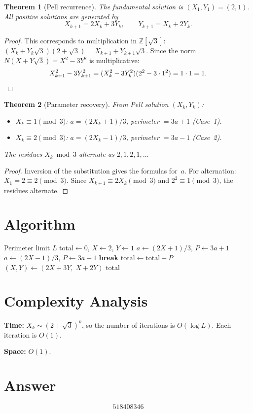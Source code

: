 \documentclass[12pt]{article}
\newtheorem{theorem}{Theorem}
\begin{document}
\begin{theorem}[Pell recurrence]
The fundamental solution is $(X_1, Y_1) = (2, 1)$. All positive solutions are generated by
\[
X_{k+1} = 2X_k + 3Y_k, \qquad Y_{k+1} = X_k + 2Y_k.
\]
\end{theorem}
\begin{proof}
This corresponds to multiplication in $\mathbb{Z}[\sqrt{3}]$: $(X_k + Y_k\sqrt{3})(2 + \sqrt{3}) = X_{k+1} + Y_{k+1}\sqrt{3}$. Since the norm $N(X + Y\sqrt{3}) = X^2 - 3Y^2$ is multiplicative:
\[
X_{k+1}^2 - 3Y_{k+1}^2 = (X_k^2 - 3Y_k^2)(2^2 - 3 \cdot 1^2) = 1 \cdot 1 = 1. \qedhere
\]
\end{proof}

\begin{theorem}[Parameter recovery]
From Pell solution $(X_k, Y_k)$:
\begin{itemize}
    \item $X_k \equiv 1 \pmod{3}$: $a = (2X_k+1)/3$, perimeter $= 3a+1$ (Case~1).
    \item $X_k \equiv 2 \pmod{3}$: $a = (2X_k-1)/3$, perimeter $= 3a-1$ (Case~2).
\end{itemize}
The residues $X_k \bmod 3$ alternate as $2, 1, 2, 1, \ldots$
\end{theorem}
\begin{proof}
Inversion of the substitution gives the formulas for~$a$. For alternation: $X_1 = 2 \equiv 2 \pmod{3}$. Since $X_{k+1} \equiv 2X_k \pmod{3}$ and $2^2 \equiv 1 \pmod{3}$, the residues alternate.
\end{proof}

\section{Algorithm}

\begin{algorithm}[H]
\caption{Sum of perimeters of almost equilateral triangles}
\begin{algorithmic}[1]
\REQUIRE Perimeter limit $L$
\STATE $\text{total} \gets 0$, $X \gets 2$, $Y \gets 1$
\LOOP
        \STATE $a \gets (2X+1)/3$, $P \gets 3a+1$
    \ELSE
        \STATE $a \gets (2X-1)/3$, $P \gets 3a-1$
    \ENDIF
     \STATE \textbf{break} \ENDIF
     \STATE $\text{total} \gets \text{total} + P$ \ENDIF
    \STATE $(X, Y) \gets (2X + 3Y,\; X + 2Y)$
\ENDLOOP
\RETURN total
\end{algorithmic}
\end{algorithm}

\section{Complexity Analysis}

\textbf{Time:} $X_k \sim (2+\sqrt{3})^k$, so the number of iterations is $O(\log L)$. Each iteration is $O(1)$.

\textbf{Space:} $O(1)$.

\section{Answer}

\[
\boxed{518408346}
\]
\end{document}
